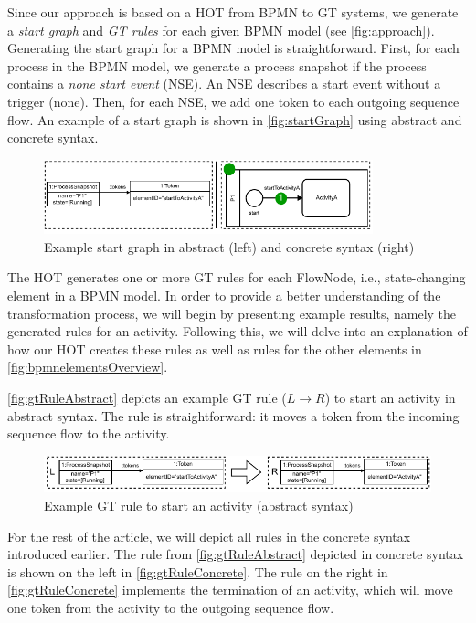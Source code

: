 \documentclass{lmcs} %
\begin{document}
Since our approach is based on a HOT from BPMN to GT systems, we generate a \textit{start graph} and \textit{GT rules} for each given BPMN model (see \autoref{fig:approach}).
Generating the start graph for a BPMN model is straightforward.
First, for each process in the BPMN model, we generate a process snapshot if the process contains a \textit{none start event} (NSE).
An NSE describes a start event without a trigger (none).
Then, for each NSE, we add one token to each outgoing sequence flow.
An example of a start graph is shown in \autoref{fig:startGraph} using abstract and concrete syntax.

\begin{figure}[ht]
    \centering
    \includegraphics[width=0.85\textwidth]{images/startGraph.pdf}
    \caption{Example start graph in abstract (left) and concrete syntax (right)}
    \label{fig:startGraph}
\end{figure}

The HOT generates one or more GT rules for each \textsf{FlowNode}, i.e., state-changing element in a BPMN model.
In order to provide a better understanding of the transformation process, we will begin by presenting example results, namely the generated rules for an activity.
Following this, we will delve into an explanation of how our HOT creates these rules as well as rules for the other elements in \autoref{fig:bpmnelementsOverview}.

\autoref{fig:gtRuleAbstract} depicts an example GT rule ($L \to R$) to start an activity in abstract syntax.
The rule is straightforward: it moves a token from the incoming sequence flow to the activity.

\begin{figure}[ht]
    \centering
  \includegraphics[width=1\textwidth]{images/rule_abstract.pdf}
  \caption{Example GT rule to start an activity (abstract syntax)}  \label{fig:gtRuleAbstract}
\end{figure}

For the rest of the article, we will depict all rules in the concrete syntax introduced earlier.
The rule from \autoref{fig:gtRuleAbstract} depicted in concrete syntax is shown on the left in \autoref{fig:gtRuleConcrete}.
The rule on the right in \autoref{fig:gtRuleConcrete} implements the termination of an activity, which will move one token from the activity to the outgoing sequence flow.
\end{document}
